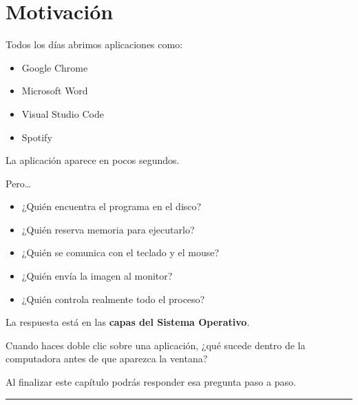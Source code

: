 \documentclass[
  spanish,
  letterpaper,
]{scrbook}
\providecommand{\tightlist}{%
  \setlength{\itemsep}{0pt}\setlength{\parskip}{0pt}}
\begin{document}

\chapter{Motivación}\label{motivaciuxf3n-1}

Todos los días abrimos aplicaciones como:

\begin{itemize}
\tightlist
\item
  Google Chrome
\item
  Microsoft Word
\item
  Visual Studio Code
\item
  Spotify
\end{itemize}

La aplicación aparece en pocos segundos.

Pero\ldots{}

\begin{itemize}
\tightlist
\item
  ¿Quién encuentra el programa en el disco?
\item
  ¿Quién reserva memoria para ejecutarlo?
\item
  ¿Quién se comunica con el teclado y el mouse?
\item
  ¿Quién envía la imagen al monitor?
\item
  ¿Quién controla realmente todo el proceso?
\end{itemize}

La respuesta está en las \textbf{capas del Sistema Operativo}.

\begin{tcolorbox}[enhanced jigsaw, arc=.35mm, bottomrule=.15mm, bottomtitle=1mm, breakable, colback=white, colbacktitle=quarto-callout-note-color!10!white, colframe=quarto-callout-note-color-frame, coltitle=black, left=2mm, leftrule=.75mm, opacityback=0, opacitybacktitle=0.6, rightrule=.15mm, title=\textcolor{quarto-callout-note-color}{\faInfo}\hspace{0.5em}{Pregunta detonadora}, titlerule=0mm, toprule=.15mm, toptitle=1mm]

Cuando haces doble clic sobre una aplicación, ¿qué sucede dentro de la
computadora antes de que aparezca la ventana?

Al finalizar este capítulo podrás responder esa pregunta paso a paso.

\end{tcolorbox}

\begin{center}\rule{0.5\linewidth}{0.5pt}\end{center}
\end{document}
